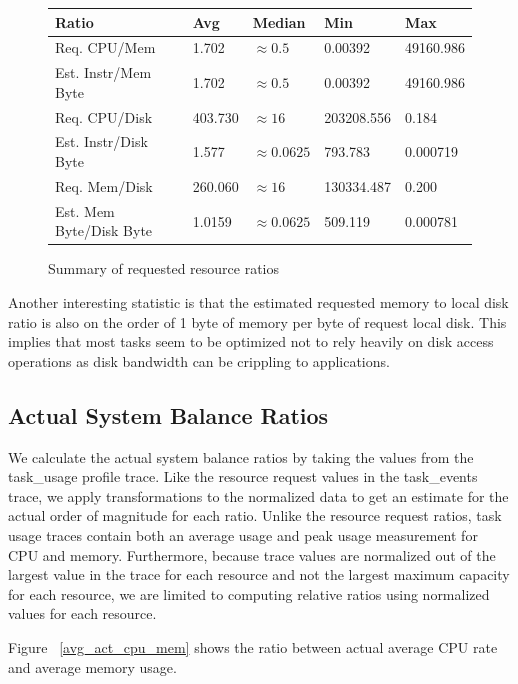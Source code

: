 \documentclass{sig-alternate}
\begin{document}
\begin{figure}
\centering
\begin{tabular}{| p{2cm} | p{1.25cm} | p{1.25cm} | p{1.25cm} | p{1.25cm } |} \hline
Ratio & Avg & Median & Min & Max \\ \hline
Req. CPU/Mem & 1.702 & $\approx 0.5$ & 0.00392 & 49160.986  \\ \hline
Est. Instr/Mem Byte & 1.702 & $\approx 0.5$ & 0.00392 & 49160.986 \\ \hline
Req. CPU/Disk & 403.730 & $\approx 16$ & 203208.556 & 0.184 \\ \hline
Est. Instr/Disk Byte & 1.577 & $\approx 0.0625$ & 793.783 & 0.000719 \\ \hline
Req. Mem/Disk & 260.060 & $\approx 16$ & 130334.487 & 0.200 \\ \hline
Est. Mem Byte/Disk Byte & 1.0159 & $\approx 0.0625$ & 509.119 & 0.000781 \\ \hline
\end{tabular}
\label{request_summary}
\caption{Summary of requested resource ratios}
\end{figure}

Another interesting statistic is that the estimated requested memory to local disk ratio is also on the order of 1 byte of memory per byte of request local disk.
This implies that most tasks seem to be optimized not to rely heavily on disk access operations as disk bandwidth can be crippling to applications.

\subsection{Actual System Balance Ratios}

We calculate the actual system balance ratios by taking the values from the task\_usage profile trace.
Like the resource request values in the task\_events trace, we apply transformations to the normalized data to get an estimate for the actual order of magnitude for each ratio.
Unlike the resource request ratios, task usage traces contain both an average usage and peak usage measurement for CPU and memory.
Furthermore, because trace values are normalized out of the largest value in the trace for each resource and not the largest maximum capacity for each resource, we are limited to computing relative ratios using normalized values for each resource.

Figure ~\ref{avg_act_cpu_mem} shows the ratio between actual average CPU rate and average memory usage.
\end{document}

